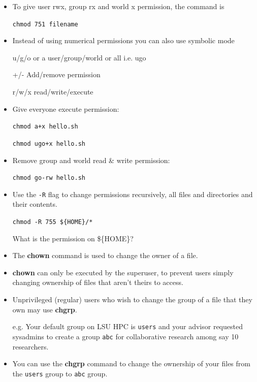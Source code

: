\documentclass[slidestop,mathserif,compress,xcolor=svgnames]{beamer}
\begin{document}
\begin{frame}
\begin{itemize}
    \item To give user rwx, group rx and world x permission, the command is
    \item[] \texttt{chmod 751 filename}
    \framebreak
    \item Instead of using numerical permissions you can also use symbolic mode
    \item[u/g/o or a] user/group/world or all i.e. ugo
    \item[+/-] Add/remove permission
    \item[r/w/x] read/write/execute
    \item Give everyone execute permission: 
    \item[] \texttt{chmod a+x hello.sh }
    \item[] \texttt{chmod ugo+x hello.sh}
    \item Remove group and world read \& write permission: 
    \item[] \texttt{chmod go-rw hello.sh}
    \item Use the \texttt{-R} flag to change permissions recursively, all files and directories and their contents.
    \item[] \texttt{chmod -R 755 \$\{HOME\}/*}
    \item[] What is the permission on \$\{HOME\}?
    \framebreak
    \item The \textbf{chown} command is used to  change the owner of a file.
    \item \textbf{chown} can only be executed by the superuser, to prevent users simply changing ownership of files that aren't theirs to access. 
    \item Unprivileged (regular) users who wish to change the group of a file that they own may use \textbf{chgrp}.
    \item[e.g.] Your default group on LSU HPC is \texttt{users} and your advisor requested sysadmins to create a group \texttt{abc} for collaborative research among say 10 researchers. 
    \item You can use the \textbf{chgrp} command to change the ownership of your files from the \texttt{users} group to \texttt{abc} group.
  \end{itemize}
\end{frame}
\end{document}
